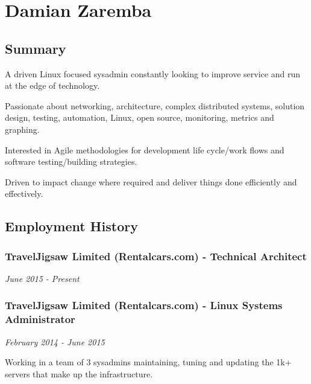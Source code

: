 \section{Damian Zaremba}\label{damian-zaremba}

\subsection{Summary}\label{summary}

A driven Linux focused sysadmin constantly looking to improve service
and run at the edge of technology.

Passionate about networking, architecture, complex distributed systems,
solution design, testing, automation, Linux, open source, monitoring,
metrics and graphing.

Interested in Agile methodologies for development life cycle/work flows
and software testing/building strategies.

Driven to impact change where required and deliver things done
efficiently and effectively.

\subsection{Employment History}\label{employment-history}

\subsubsection{TravelJigsaw Limited (Rentalcars.com) - Technical
Architect}\label{traveljigsaw-limited-rentalcars.com---technical-architect}

\emph{June 2015 - Present}

\subsubsection{TravelJigsaw Limited (Rentalcars.com) - Linux Systems
Administrator}\label{traveljigsaw-limited-rentalcars.com---linux-systems-administrator}

\emph{February 2014 - June 2015}

Working in a team of 3 sysadmins maintaining, tuning and updating the
1k+ servers that make up the infrastructure.


